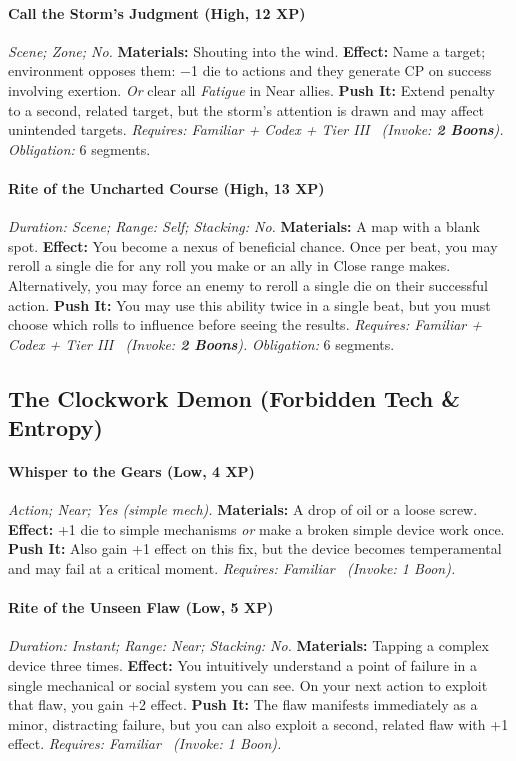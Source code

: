 \paragraph{Call the Storm's Judgment (High, 12 XP)} \emph{Scene; Zone; No.}
\textbf{Materials:} Shouting into the wind.
\textbf{Effect:} Name a target; environment opposes them: −1 die to actions and they generate CP on success involving exertion. \emph{Or} clear all \emph{Fatigue} in Near allies.
\textbf{Push It:} Extend penalty to a second, related target, but the storm's attention is drawn and may affect unintended targets.
\emph{Requires: Familiar + Codex + Tier III \ (\textit{Invoke:} \textbf{2 Boons}).}
\emph{Obligation:} 6 segments.

\paragraph{Rite of the Uncharted Course (High, 13 XP)} \emph{Duration: Scene; Range: Self; Stacking: No.}
\textbf{Materials:} A map with a blank spot.
\textbf{Effect:} You become a nexus of beneficial chance. Once per beat, you may reroll a single die for any roll you make or an ally in Close range makes. Alternatively, you may force an enemy to reroll a single die on their successful action.
\textbf{Push It:} You may use this ability twice in a single beat, but you must choose which rolls to influence before seeing the results.
\emph{Requires: Familiar + Codex + Tier III \ (\textit{Invoke:} \textbf{2 Boons}).}
\emph{Obligation:} 6 segments.

\subsection{The Clockwork Demon (Forbidden Tech \& Entropy)}
\paragraph{Whisper to the Gears (Low, 4 XP)} \emph{Action; Near; Yes (simple mech).}
\textbf{Materials:} A drop of oil or a loose screw.
\textbf{Effect:} +1 die to simple mechanisms \emph{or} make a broken simple device work once.
\textbf{Push It:} Also gain +1 effect on this fix, but the device becomes temperamental and may fail at a critical moment.
\emph{Requires: Familiar \ (\textit{Invoke:} 1 Boon).}
\paragraph{Rite of the Unseen Flaw (Low, 5 XP)} \emph{Duration: Instant; Range: Near; Stacking: No.}
\textbf{Materials:} Tapping a complex device three times.
\textbf{Effect:} You intuitively understand a point of failure in a single mechanical or social system you can see. On your next action to exploit that flaw, you gain +2 effect.
\textbf{Push It:} The flaw manifests immediately as a minor, distracting failure, but you can also exploit a second, related flaw with +1 effect.
\emph{Requires: Familiar \ (\textit{Invoke:} 1 Boon).}
